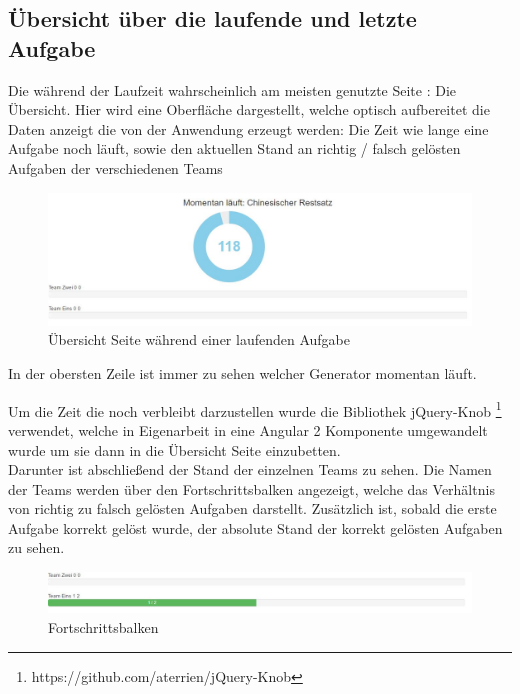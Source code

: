 \begin{enumerate}
\subsection{Übersicht über die laufende und letzte Aufgabe}

Die während der Laufzeit wahrscheinlich am meisten genutzte Seite : Die Übersicht. Hier wird eine Oberfläche dargestellt, welche optisch aufbereitet die Daten anzeigt die von der Anwendung erzeugt werden: Die Zeit wie lange eine Aufgabe noch läuft, sowie den aktuellen Stand an richtig / falsch gelösten Aufgaben der verschiedenen Teams \\
\begin{figure}[htp]     %
\centering
\includegraphics[width=1\textwidth]{bilder/Overview} 
\caption[Übersicht Seite während einer laufenden Aufgabe]{Übersicht Seite während einer laufenden Aufgabe}
\end{figure} 
In der obersten Zeile ist immer zu sehen welcher Generator momentan läuft.

Um die Zeit die noch verbleibt darzustellen wurde die Bibliothek jQuery-Knob \footnote{https://github.com/aterrien/jQuery-Knob} verwendet, welche in Eigenarbeit in eine Angular 2 Komponente umgewandelt wurde um sie dann in die Übersicht Seite einzubetten. \\

Darunter ist abschließend der Stand der einzelnen Teams zu sehen. Die Namen der Teams werden über den Fortschrittsbalken angezeigt, welche das Verhältnis von richtig zu falsch gelösten Aufgaben darstellt. Zusätzlich ist, sobald die erste Aufgabe korrekt gelöst wurde, der absolute Stand der korrekt gelösten Aufgaben zu sehen. \\

\begin{figure}[htp]     %
\centering
\includegraphics[width=1\textwidth]{bilder/Bars} 
\caption[Fortschrittsbalken]{Fortschrittsbalken}
\end{figure} 


\end{enumerate}
